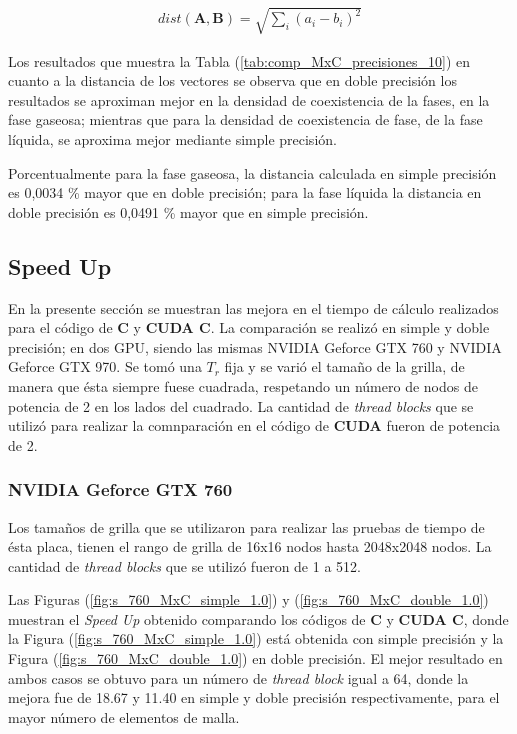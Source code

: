 \begin{align}
dist(\mathbf{A},\mathbf{B}) = \sqrt{\sum_i {\left( a_i - b_i \right)}^2  }
\label{eq:norma_euclidea}
\end{align}

Los resultados que muestra la Tabla (\ref{tab:comp_MxC_precisiones_10}) en cuanto a la distancia de los vectores se observa que en doble precisión los resultados se aproximan mejor en la densidad de coexistencia de la fases, en la fase gaseosa; mientras que para la densidad de coexistencia de fase, de la fase líquida, se aproxima mejor mediante simple precisión. 

Porcentualmente para la fase gaseosa, la distancia calculada en simple precisión es 0,0034 \% mayor que en doble precisión; para la fase líquida la distancia en doble precisión es 0,0491 \% mayor que en simple precisión.




\newpage

\subsection{Speed Up}

En la presente sección se muestran las mejora en el tiempo de cálculo realizados para el código de \textbf{C} y \textbf{CUDA C}. La comparación se realizó en simple y doble precisión; en dos GPU, siendo las mismas NVIDIA Geforce GTX 760 y NVIDIA Geforce GTX 970. Se tomó una $T_r$ fija y se varió el tamaño de la grilla, de manera que ésta siempre fuese cuadrada, respetando un número de nodos de potencia de 2 en los lados del cuadrado. La cantidad de \textit{thread blocks} que se utilizó para realizar la comnparación en el código de \textbf{CUDA} fueron de potencia de 2.

\subsubsection{NVIDIA Geforce GTX 760}

Los tamaños de grilla que se utilizaron para realizar las pruebas de tiempo de ésta placa, tienen el rango de grilla de 16x16 nodos hasta 2048x2048 nodos. La cantidad de \textit{thread blocks} que se utilizó fueron de 1 a 512.

Las Figuras (\ref{fig:s_760_MxC_simple_1.0}) y (\ref{fig:s_760_MxC_double_1.0}) muestran el \textit{Speed Up} obtenido comparando los códigos de \textbf{C} y \textbf{CUDA C}, donde la Figura (\ref{fig:s_760_MxC_simple_1.0}) está obtenida con simple precisión y la Figura (\ref{fig:s_760_MxC_double_1.0}) en doble precisión. El mejor resultado en ambos casos se obtuvo para un número de \textit{thread block} igual a 64, donde la mejora fue de 18.67 y 11.40 en simple y doble precisión respectivamente, para el mayor número de elementos de malla.


